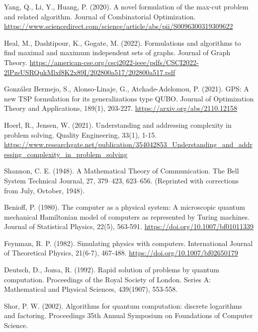 \begin{thebibliography}{a}

Yang, Q., Li, Y., Huang, P. (2020). A novel formulation of the max-cut problem and related algorithm. Journal of Combinatorial Optimization.
\url{https://www.sciencedirect.com/science/article/abs/pii/S0096300319309622}

Heal, M., Dashtipour, K., Gogate, M. (2022). Formulations and algorithms to find maximal and maximum independent sets of graphs. Journal of Graph Theory.
\url{https://american-cse.org/csci2022-ieee/pdfs/CSCI2022-2lPzsUSRQukMlxf8K2x89I/202800a517/202800a517.pdf}

González Bermejo, S., Alonso-Linaje, G., Atchade-Adelomou, P. (2021). GPS: A new TSP formulation for its generalizations type QUBO. Journal of Optimization Theory and Applications, 189(1), 203-227.
\url{https://arxiv.org/abs/2110.12158}

Hoerl, R., Jensen, W. (2021). Understanding and addressing complexity in problem solving. Quality Engineering, 33(1), 1-15.
\url{https://www.researchgate.net/publication/354042853_Understanding_and_addressing_complexity_in_problem_solving}

Shannon, C. E. (1948). A Mathematical Theory of Communication. The Bell System Technical Journal, 27, 379–423, 623–656. (Reprinted with corrections from July, October, 1948).

Benioff, P. (1980). The computer as a physical system: A microscopic quantum mechanical Hamiltonian model of computers as represented by Turing machines. Journal of Statistical Physics, 22(5), 563-591. \url{https://doi.org/10.1007/bf01011339}

Feynman, R. P. (1982). Simulating physics with computers. International Journal of Theoretical Physics, 21(6-7), 467-488. \url{https://doi.org/10.1007/bf02650179}

Deutsch, D., Jozsa, R. (1992). Rapid solution of problems by quantum computation. Proceedings of the Royal Society of London. Series A: Mathematical and Physical Sciences, 439(1907), 553-558.

Shor, P. W. (2002). Algorithms for quantum computation: discrete logarithms and factoring. Proceedings 35th Annual Symposium on Foundations of Computer Science.


\end{thebibliography}
